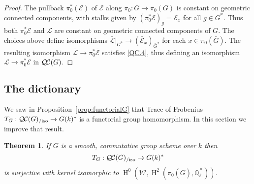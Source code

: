\documentclass{amsart}
\theoremstyle{plain}
\newtheorem{theorem}{Theorem}[section]
\theoremstyle{definition}
\theoremstyle{remark}
\newcommand{\EE}{\mathbb{\bar Q}_\ell}
\newcommand{\Fq}{k}
\newcommand{\EEx}{\EE^\times}
\newcommand{\Weil}[1]{\mathcal{W}_{#1}}
\DeclareMathOperator{\Hh}{H}
\newcommand{\qcs}[1]{{\mathcal{#1}}}
\newcommand{\gqcs}[1]{{\mathcal{\bar #1}}}
\newcommand{\QC}{{\mathcal{Q\hskip-0.8pt C}}}
\newcommand{\QCiso}[1]{\QC(#1)_{/\text{iso}}}
\newcommand{\TrFrob}[1]{T_{#1}}
\newcommand{\bG}{\bar{G}}
\begin{document}
\begin{proof}
The pullback $\pi_0^*(\qcs{E})$ of $\qcs{E}$ along $\pi_0 : G \to \pi_0(G)$ is constant
on geometric connected components, with stalks given by
$(\pi_0^* \qcs{E})_g = \qcs{E}_{x}$ for all $g\in \bG^x$.  Thus both $\pi_0^*\qcs{E}$ and $\qcs{L}$
are constant on geometric connected components of $G$.
The choices above define isomorphisms
$\gqcs{L}\vert_{\bG^x} \to  (\gqcs{E}_{x})_{\bG^x}$ for each $x\in \pi_0(\bG)$.
The resulting isomorphism $\gqcs{L} \to \pi_0^* \gqcs{E}$ satisfies \ref{QC.4},
thus defining an isomorphism $\qcs{L} \to \pi_0^* \qcs{E}$ in $\QC(G)$.
\end{proof}

\subsection{The dictionary}
\label{sec:snake}

We saw in Proposition~\ref{prop:functorialG} that Trace of Frobenius
$\TrFrob{G} : \QCiso{G} \to G(\Fq)^*$ is a functorial group homomorphism.
In this section we improve that result.

\begin{theorem}\label{thm:snake}
  If $G$ is a smooth, commutative group scheme over $\Fq$ then
  \[
  \TrFrob{G} : \QCiso{G} \to G(\Fq)^*
  \]
is surjective with kernel isomorphic to $\Hh^0(\Weil{},\Hh^2(\pi_0({\bar G}),\EEx))$.
\end{theorem}
\end{document}
